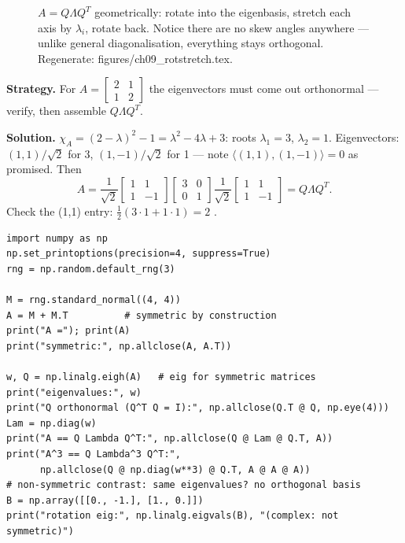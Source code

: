 \begin{figure}[htbp]
\centering

\caption{$A=Q\Lambda Q^{T}$ geometrically: rotate into the eigenbasis,
stretch each axis by $\lambda_i$, rotate back. Notice there are no skew
angles anywhere --- unlike general diagonalisation, everything stays
orthogonal. Regenerate: \ttfamily figures/ch09\_rotstretch.tex.}
\label{fig:rotstretch}
\end{figure}

\begin{example}\label{ex:spec2}
\textbf{Strategy.} For $A=\begin{bmatrix}2&1\\1&2\end{bmatrix}$ the
eigenvectors must come out orthonormal --- verify, then assemble
$Q\Lambda Q^{T}$.

\textbf{Solution.} $\chi_A=(2-\lambda)^2-1=\lambda^2-4\lambda+3$: roots
$\lambda_1=3$, $\lambda_2=1$. Eigenvectors: $(1,1)/\sqrt2$ for 3,
$(1,-1)/\sqrt2$ for 1 --- note $\langle(1,1),(1,-1)\rangle=0$ as promised.
Then
\[
A=\frac1{\sqrt2}\begin{bmatrix}1&1\\1&-1\end{bmatrix}
\begin{bmatrix}3&0\\0&1\end{bmatrix}
\frac1{\sqrt2}\begin{bmatrix}1&1\\1&-1\end{bmatrix}=Q\Lambda Q^{T}.
\]
Check the (1,1) entry: $\frac12(3\cdot1+1\cdot1)=2$ \checkmark.
\end{example}

\begin{lstlisting}[caption={\ttfamily code/ch09\_spec\_verify.py --- a random
symmetric matrix: eigenvalues real, $Q$ orthogonal, reconstruction exact.}]
import numpy as np
np.set_printoptions(precision=4, suppress=True)
rng = np.random.default_rng(3)

M = rng.standard_normal((4, 4))
A = M + M.T          # symmetric by construction
print("A ="); print(A)
print("symmetric:", np.allclose(A, A.T))

w, Q = np.linalg.eigh(A)   # eig for symmetric matrices
print("eigenvalues:", w)
print("Q orthonormal (Q^T Q = I):", np.allclose(Q.T @ Q, np.eye(4)))
Lam = np.diag(w)
print("A == Q Lambda Q^T:", np.allclose(Q @ Lam @ Q.T, A))
print("A^3 == Q Lambda^3 Q^T:",
      np.allclose(Q @ np.diag(w**3) @ Q.T, A @ A @ A))
# non-symmetric contrast: same eigenvalues? no orthogonal basis
B = np.array([[0., -1.], [1., 0.]])
print("rotation eig:", np.linalg.eigvals(B), "(complex: not symmetric)")
\end{lstlisting}

